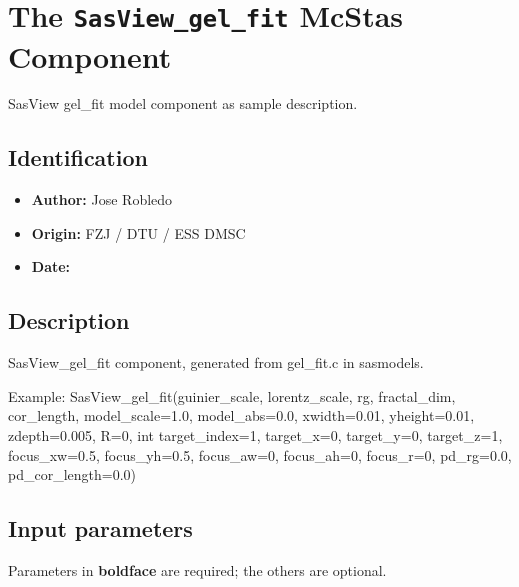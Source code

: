 \section{The \texttt{SasView\_gel\_fit} McStas Component}
SasView gel\_fit model component as sample description.

\subsection*{Identification}
\begin{itemize}
  \item \textbf{Author:} Jose Robledo
  \item \textbf{Origin:} FZJ / DTU / ESS DMSC
  \item \textbf{Date:} 
\end{itemize}

\subsection*{Description}
SasView\_gel\_fit component, generated from gel\_fit.c in sasmodels.

Example: SasView\_gel\_fit(guinier\_scale, lorentz\_scale, rg, fractal\_dim, cor\_length, model\_scale=1.0, model\_abs=0.0, xwidth=0.01, yheight=0.01, zdepth=0.005, R=0, int target\_index=1, target\_x=0, target\_y=0, target\_z=1, focus\_xw=0.5, focus\_yh=0.5, focus\_aw=0, focus\_ah=0, focus\_r=0, pd\_rg=0.0, pd\_cor\_length=0.0)

\subsection*{Input parameters}
Parameters in \textbf{boldface} are required; the others are optional.

